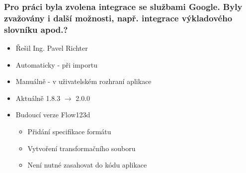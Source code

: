 \begin{frame}[noframenumbering]
\begin{center}
	\frametitle{Pro práci byla zvolena integrace se službami Google. Byly zvažovány i další možnosti, např. integrace výkladového slovníku apod.?}
	\begin{itemize}[<+->]
		\item Řešil Ing. Pavel Richter
		\item Automaticky - při importu
		\item Manuálně - v uživatelském rozhraní aplikace
		\item Aktuálně 1.8.3 $\rightarrow$ 2.0.0
		\item Budoucí verze Flow123d
		\begin{itemize}
			\item Přidání specifikace formátu
			\item Vytvoření transformačního souboru
			\item Není nutné zasahovat do kódu aplikace
		\end{itemize}
	\end{itemize}
\end{center}
\end{frame}


